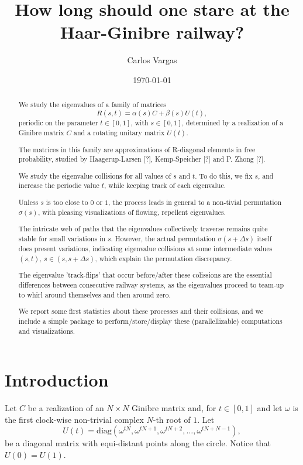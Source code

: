 \documentclass{article}
\title{How long should one stare at the Haar-Ginibre railway?}
\author{Carlos Vargas}
\date{\today}
\begin{document}
	\maketitle	
	\begin{abstract}
		We study the eigenvalues of a family of matrices 
		$$R(s,t) = \alpha(s)C + \beta(s)U(t),$$ 
		periodic on the parameter $t\in [0,1]$, with $s\in [0, 1]$,   
		determined by a realization of a Ginibre matrix $C$ 
		and a rotating unitary matrix $U(t)$. 
		
		The matrices in this family are approximations of 
		R-diagonal elements in free probability, studied by 
		Haagerup-Larsen [?], Kemp-Speicher [?] and P. Zhong [?]. 
		
		We study the eigenvalue collisions for all values of $s$ and $t$. 
		To do this, we fix $s$, and increase the periodic value $t$, 
		while keeping track of each eigenvalue.	
		
		Unless $s$ is too close to $0$ or $1$, 
		the process leads in general to a non-tivial permutation $\sigma(s)$, 
		with pleasing visualizations of flowing, repellent eigenvalues.
		
		The intricate web of paths that the eigenvalues collectively traverse 
		remains quite stable for small variations in $s$. 
		However, the actual permutation $\sigma(s + \Delta s)$ 
		itself does present variations, 
		indicating eigenvalue collisions 
		at some intermediate values $(s,t)$, $s\in (s, s + \Delta s)$,
		which explain the permutation discrepancy. 
		
		The eigenvalue 'track-flips' that occur before/after these colissions 
		are the essential differences between consecutive railway systems, 
		as the eigenvalues proceed to team-up to whirl around themselves and then around zero.
		
		We report some first statistics about these processes and their collisions, 
		and we include a simple package to perform/store/display these (parallellizable) 
		computations and visualizations.
 	\end{abstract}
	\section{Introduction}

	Let $C$ be a realization of an $N\times N$ Ginibre matrix and, for $t\in [0,1]$ and 
	let $\omega$ is the first clock-wise non-trivial complex $N$-th root of $1$. Let
	$$U(t) = \mathrm{diag}(\omega^{tN}, \omega^{tN+1}, \omega^{tN+2}, \dots   , \omega^{tN+N-1}),$$ 
	be a diagonal matrix with equi-distant points along the circle. Notice that $U(0) = U(1)$.
\end{document}
